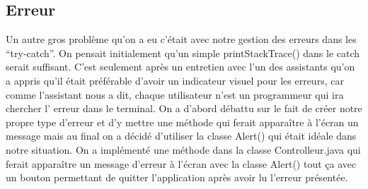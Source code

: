 \documentclass[../main.tex]{subfiles}
\begin{document}
\subsection{Erreur}
Un autre gros problème qu’on a eu c’était avec notre gestion des erreurs dans les “try-catch”.
On pensait initialement qu’un simple printStackTrace() dans le catch serait suffisant.
C’est seulement après un entretien avec l’un des assistants qu’on a appris qu’il était préférable d’avoir un indicateur visuel pour les erreurs, car comme l'assistant nous a dit, chaque utilisateur n'est un programmeur qui ira chercher l' erreur dans le terminal.
On a d’abord débattu sur le fait de créer notre propre type d’erreur et d’y mettre une méthode qui ferait apparaître à l’écran un message mais au final on a décidé d’utiliser la classe Alert() qui était idéale dans notre situation.
On a implémenté une méthode dans la classe Controlleur.java qui ferait apparaître un message d’erreur à l'écran avec la classe Alert() tout ça avec un bouton permettant de quitter l’application après avoir lu l’erreur présentée.

\newpage
\end{document}
